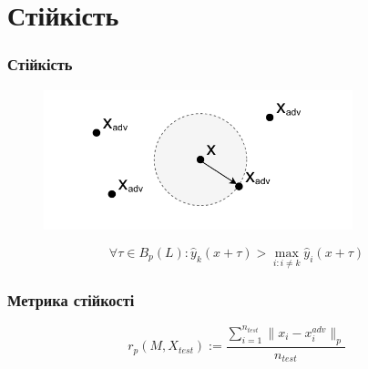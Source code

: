 \documentclass{beamer}
\numberwithin{equation}{section}
\begin{document}
	\section{Стійкість}
	\begin{frame}
		\frametitle{Стійкість}
		
		\begin{figure}[h]
			\centering
			\includegraphics[width=0.8\textwidth]{../images/2Dball.pdf}
			
		\end{figure}
		\begin{equation}
			\forall \tau \in B_{p}(L): \hat{y}_{k}(x+\tau)>\max _{i: i \neq k} \hat{y}_{i}(x+\tau)
		\end{equation}
		
	\end{frame}
	\begin{frame}
		\frametitle{Метрика стійкості}
		\begin{equation}
			r_p(M, X_{test}) := \frac{\sum\limits^{n_{test}}_{i = 1}\|x_i-x^{adv}_i\|_{p}}{n_{test}}
		\end{equation}
	\end{frame}
\end{document}
